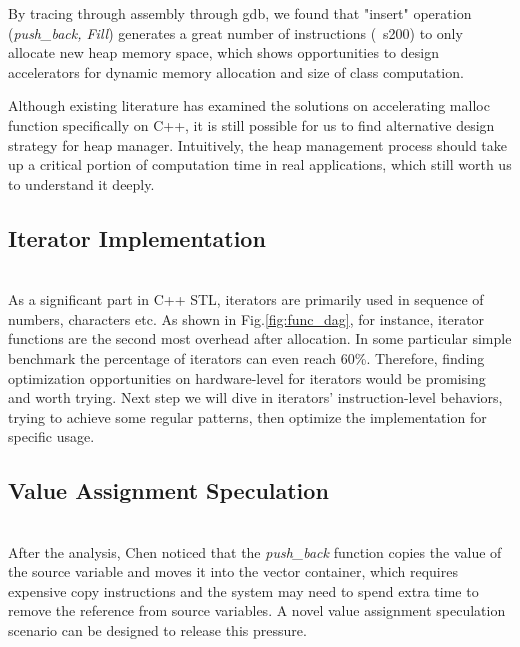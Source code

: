 \documentclass[9pt]{article}
\begin{document}
By tracing through assembly through gdb, we found that "insert" operation (\textit{push\_back, Fill}) generates a great number of instructions (~s200) to only allocate new heap memory space, which shows opportunities to design accelerators for dynamic memory allocation and size of class computation. 

Although existing literature \cite{kanev2017mallacc} has examined the solutions on accelerating malloc function specifically on C++, it is still possible for us to find alternative design strategy for heap manager. Intuitively, the heap management process should take up a critical portion of computation time in real applications, which still worth us to understand it deeply.

\subsection{Iterator Implementation}\\

As a significant part in C++ STL, iterators are primarily used in sequence of numbers, characters etc. As shown in Fig.\ref{fig:func_dag}, for instance, iterator functions are the second most overhead after allocation. In some particular simple benchmark the percentage of iterators can even reach 60\%. Therefore, finding optimization opportunities on hardware-level for iterators would be promising and worth trying. Next step we will dive in iterators' instruction-level behaviors, trying to achieve some regular patterns, then optimize the implementation for specific usage.


\subsection{Value Assignment Speculation}\\
After the analysis, Chen noticed that the \textit{push\_back} function copies the value of the source variable and moves it into the vector container, which requires expensive copy instructions and the system may need to spend extra time to remove the reference\cite{cplusplus.com} from source variables. A novel value assignment speculation scenario can be designed to release this pressure.
\end{document}

